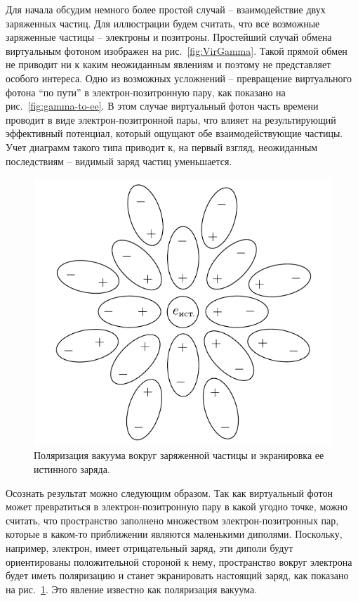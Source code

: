 \documentclass[a4paper, 12pt]{article}
\begin{document}
Для начала обсудим немного более простой случай -- взаимодействие двух заряженных частиц.
Для иллюстрации будем считать, что все возможные заряженные частицы -- электроны и позитроны. 
Простейший случай обмена виртуальным фотоном изображен на рис.~\ref{fig:VirGamma}. 
Такой прямой обмен не приводит ни к каким неожиданным явлениям и поэтому не представляет особого интереса. 
Одно из возможных усложнений -- превращение виртуального фотона ``по пути'' в электрон-позитронную пару, как показано на рис.~\ref{fig:gamma-to-ee}. 
В этом случае виртуальный фотон часть времени проводит в виде электрон-позитронной пары, что влияет на результирующий эффективный потенциал, который ощущают обе взаимодействующие частицы. 
Учет диаграмм такого типа приводит к, на первый взгляд, неожиданным последствиям -- видимый заряд частиц уменьшается. 

\begin{figure}
\includegraphics[width=.6\linewidth]{figs/VacPol}
\caption{Поляризация вакуума вокруг заряженной частицы и экранировка ее истинного заряда.}
\label{fig:VacPol}
\end{figure}

Осознать результат можно следующим образом. 
Так как виртуальный фотон может превратиться в электрон-позитронную пару в какой угодно точке, можно считать, что пространство заполнено множеством электрон-позитронных пар, которые в каком-то приближении являются маленькими диполями. 
Поскольку, например, электрон, имеет отрицательный заряд, эти диполи будут ориентированы положительной стороной к нему, пространство вокруг электрона будет иметь поляризацию и станет экранировать настоящий заряд, как показано на рис.~\ref{fig:VacPol}. 
Это явление известно как поляризация вакуума. 
\end{document}
